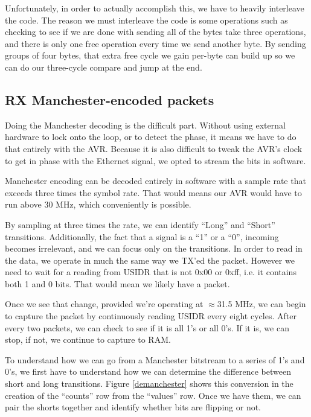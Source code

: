 \documentclass[13pt]{ltxdoc}
\begin{document}
Unfortunately, in order to actually accomplish this, we have to heavily interleave the code.  The 
reason we must interleave the code is some operations such as checking to see if we are done with
sending all of the bytes take three operations, and there is only one free operation every time
we send another byte.  By sending groups of four bytes, that extra free cycle we gain per-byte can build up so we can
do our three-cycle compare and jump at the end.  

\subsection{RX Manchester-encoded packets}
\label{rxmch}
Doing the Manchester decoding is the difficult part.  Without using external hardware to lock onto
the loop, or to detect the phase, it means we have to do that entirely with the AVR.  Because it is
also difficult to tweak the AVR's clock to get in phase with the Ethernet signal, we opted to 
stream the bits in software.

Manchester encoding can be decoded entirely in software with a sample rate that exceeds three
times the symbol rate.  That would means our AVR would have to run above 30 MHz, which
conveniently is possible.

By sampling at three times the rate, we can identify ``Long'' and ``Short'' transitions.  Additionally,
the fact that a signal is a ``1'' or a ``0'', incoming becomes irrelevant, and we can focus only on
the transitions.  In order to read in the data, we operate in much the same way we TX'ed the packet.  However
we need to wait for a reading from USIDR that is not 0x00 or 0xff, i.e. it contains both 1 and 0 bits. That
would mean we likely have a packet.

Once we see that change, provided we're operating at $\approx$31.5 MHz, we can begin to capture the packet
by continuously reading USIDR every eight cycles.  After every two packets, we can check to see if
it is all 1's or all 0's.  If it is, we can stop, if not, we continue to capture to RAM.

To understand how we can go from a Manchester bitstream to a series of 1's and 0's, we first
have to understand how we can determine the difference between short and long transitions.  Figure
\ref{demanchester} shows this conversion in the creation of the ``counts'' row from the ``values'' row.
Once we have them, we can pair the shorts together and identify whether bits are flipping or not.
\end{document}
